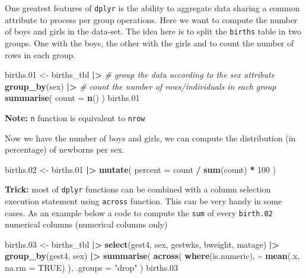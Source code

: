\documentclass[
]{book}
\newenvironment{Shaded}{\begin{snugshade}}{\end{snugshade}}
\newcommand{\AttributeTok}[1]{\textcolor[rgb]{0.13,0.29,0.53}{#1}}
\newcommand{\CommentTok}[1]{\textcolor[rgb]{0.56,0.35,0.01}{\textit{#1}}}
\newcommand{\ConstantTok}[1]{\textcolor[rgb]{0.56,0.35,0.01}{#1}}
\newcommand{\DecValTok}[1]{\textcolor[rgb]{0.00,0.00,0.81}{#1}}
\newcommand{\FloatTok}[1]{\textcolor[rgb]{0.00,0.00,0.81}{#1}}
\newcommand{\FunctionTok}[1]{\textcolor[rgb]{0.13,0.29,0.53}{\textbf{#1}}}
\newcommand{\NormalTok}[1]{#1}
\newcommand{\OtherTok}[1]{\textcolor[rgb]{0.56,0.35,0.01}{#1}}
\newcommand{\SpecialCharTok}[1]{\textcolor[rgb]{0.81,0.36,0.00}{\textbf{#1}}}
\newcommand{\StringTok}[1]{\textcolor[rgb]{0.31,0.60,0.02}{#1}}
\begin{document}
One greatest features of \texttt{dplyr} is the ability to aggregate data sharing a common attribute to process per group operations.
Here we want to compute the number of boys and girls in the data-set.
The idea here is to split the \texttt{births} table in two groups. One with the boys, the other with the girls and to count the number of rows in each group.

\begin{Shaded}
\begin{Highlighting}[]
\NormalTok{births}\FloatTok{.01} \OtherTok{\textless{}{-}}
\NormalTok{  births\_tbl }\SpecialCharTok{|\textgreater{}}
  \CommentTok{\# group the data according to the sex attribute}
  \FunctionTok{group\_by}\NormalTok{(sex) }\SpecialCharTok{|\textgreater{}}
  \CommentTok{\# count the number of rows/individuals in each group}
  \FunctionTok{summarise}\NormalTok{(}
    \AttributeTok{count =} \FunctionTok{n}\NormalTok{()}
\NormalTok{  )}
\NormalTok{births}\FloatTok{.01}
\end{Highlighting}
\end{Shaded}

\textbf{Note:} \texttt{n} function is equivalent to \texttt{nrow}

Now we have the number of boys and girls, we can compute the distribution (in percentage) of newborns per sex.

\begin{Shaded}
\begin{Highlighting}[]
\NormalTok{births}\FloatTok{.02} \OtherTok{\textless{}{-}}
\NormalTok{  births}\FloatTok{.01} \SpecialCharTok{|\textgreater{}}
  \FunctionTok{mutate}\NormalTok{(}
    \AttributeTok{percent =}\NormalTok{ count }\SpecialCharTok{/} \FunctionTok{sum}\NormalTok{(count) }\SpecialCharTok{*} \DecValTok{100}
\NormalTok{  )}
\end{Highlighting}
\end{Shaded}

\textbf{Trick:} most of \texttt{dplyr} functions can be combined with a column selection execution statement using
\texttt{across} function. This can be very handy in some cases.
As an example below a code to compute the \texttt{sum} of every \texttt{birth.02} numerical columns (numerical columns only)

\begin{Shaded}
\begin{Highlighting}[]
\NormalTok{births}\FloatTok{.03} \OtherTok{\textless{}{-}}
\NormalTok{  births\_tbl }\SpecialCharTok{|\textgreater{}}
  \FunctionTok{select}\NormalTok{(gest4, sex, gestwks, bweight, matage) }\SpecialCharTok{|\textgreater{}}
  \FunctionTok{group\_by}\NormalTok{(gest4, sex) }\SpecialCharTok{|\textgreater{}}
  \FunctionTok{summarise}\NormalTok{(}
    \FunctionTok{across}\NormalTok{(}
      \FunctionTok{where}\NormalTok{(is.numeric),}
      \SpecialCharTok{\textasciitilde{}} \FunctionTok{mean}\NormalTok{(.x, }\AttributeTok{na.rm =} \ConstantTok{TRUE}\NormalTok{)}
\NormalTok{    ),}
    \AttributeTok{.groups =} \StringTok{"drop"}
\NormalTok{  )}
\NormalTok{births}\FloatTok{.03}
\end{Highlighting}
\end{Shaded}
\end{document}
